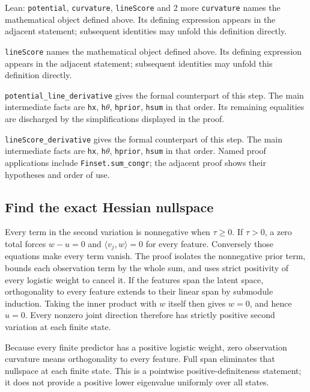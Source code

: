 \documentclass[11pt,a4paper]{report}
\begin{document}
\begin{leanbox}{Lean: \texttt{potential}, \texttt{curvature}, \texttt{lineScore} and 2 more}
\texttt{curvature} names the mathematical object defined above. Its defining expression appears in the adjacent statement; subsequent identities may unfold this definition directly.




\texttt{line\allowbreak{}Score} names the mathematical object defined above. Its defining expression appears in the adjacent statement; subsequent identities may unfold this definition directly.




\texttt{potential\_\allowbreak{}line\_\allowbreak{}derivative} gives the formal counterpart of this step. The main intermediate facts are \texttt{hx}, \texttt{h\ensuremath{\theta}}, \texttt{hprior}, \texttt{hsum} in that order. Its remaining equalities are discharged by the simplifications displayed in the proof.




\texttt{line\allowbreak{}Score\_\allowbreak{}derivative} gives the formal counterpart of this step. The main intermediate facts are \texttt{hx}, \texttt{h\ensuremath{\theta}}, \texttt{hprior}, \texttt{hsum} in that order. Named proof applications include \texttt{Finset.\allowbreak{}sum\_\allowbreak{}congr}; the adjacent proof shows their hypotheses and order of use.
\end{leanbox}
\subsection{\texorpdfstring{Find the exact Hessian nullspace}{Find the exact Hessian nullspace}}
\label{report-step-KIPLMC-LogisticExample-lean-3}


Every term in the second variation is nonnegative when \(\tau\ge0\). If \(\tau>0\), a zero total forces \(w-u=0\) and \(\langle v_j,w\rangle=0\) for every feature. Conversely those equations make every term vanish. The proof isolates the nonnegative prior term, bounds each observation term by the whole sum, and uses strict positivity of every logistic weight to cancel it. If the features span the latent space, orthogonality to every feature extends to their linear span by submodule induction. Taking the inner product with \(w\) itself then gives \(w=0\), and hence \(u=0\). Every nonzero joint direction therefore has strictly positive second variation at each finite state.



Because every finite predictor has a positive logistic weight, zero observation curvature means orthogonality to every feature. Full span eliminates that nullspace at each finite state. This is a pointwise positive-definiteness statement; it does not provide a positive lower eigenvalue uniformly over all states.
\end{document}
